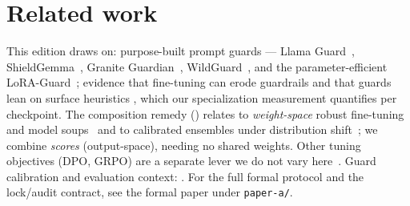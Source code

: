 \documentclass[11pt]{article}
\newcommand{\code}[1]{\texttt{\small #1}}
\begin{document}
\section*{Related work}
This edition draws on: purpose-built prompt guards --- Llama Guard~\cite{inan2023llamaguard},
ShieldGemma~\cite{zeng2024shieldgemma}, Granite Guardian~\cite{padhi2024graniteguardian},
WildGuard~\cite{han2024wildguard}, and the parameter-efficient LoRA-Guard~\cite{elesedy2024loraguard};
evidence that fine-tuning can erode guardrails and that guards lean on surface heuristics
\cite{hsiung2025guardrails,li2026surfaceheuristics,bassani2025robustness}, which our
specialization measurement quantifies per checkpoint. The composition remedy ()
relates to \emph{weight-space} robust fine-tuning and model soups~\cite{wortsman2022wiseft,wortsman2022modelsoups}
and to calibrated ensembles under distribution shift~\cite{kumar2022calibrated}; we combine
\emph{scores} (output-space), needing no shared weights. Other tuning objectives (DPO, GRPO) are
a separate lever we do not vary here~\cite{rafailov2023dpo,shao2024deepseekmath,vennemeyer2026objective}.
Guard calibration and evaluation context: \cite{guo2017calibration,liu2025calibration,bassani2024guardbench}.
For the full formal protocol and the lock/audit contract, see the formal paper under \code{paper-a/}.



\end{document}
